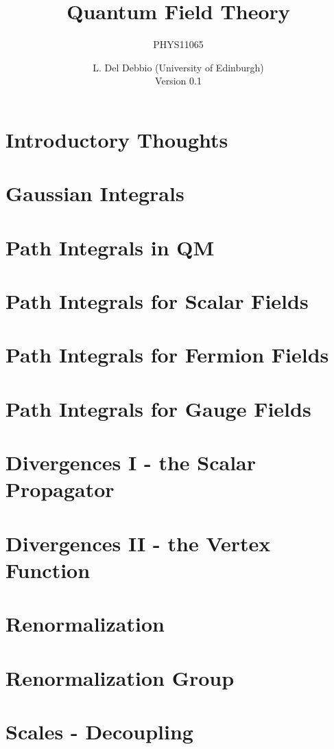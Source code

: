 \documentclass[11pt]{scrreprt}
\title{Quantum Field Theory}
\subtitle{PHYS11065}
\author{L. Del Debbio (University of Edinburgh)\\
  Version 0.1}
\begin{document}

\clearemptydoublepage
\tableofcontents
\clearemptydoublepage


\chapter*{Introductory Thoughts}
\label{chap:intro}


\chapter{Gaussian Integrals}
\label{chap:lec0}


\chapter{Path Integrals in QM}
\label{chap:lec1}


\chapter{Path Integrals for Scalar Fields}
\label{cha:path-integr-scal}



\chapter{Path Integrals for Fermion Fields}
\label{cha:path-integr-ferm}


\chapter{Path Integrals for Gauge Fields}
\label{cha:path-integrals-gauge}



\chapter{Divergences I - the Scalar Propagator}
\label{cha:divergences-i-scalar}



\chapter{Divergences II - the Vertex Function}
\label{cha:diverg-ii-vert}



\chapter{Renormalization}
\label{cha:renormalization}
% 


\chapter{Renormalization Group}
\label{cha:renorm-group}

\chapter{Scales - Decoupling}
\label{cha:scales-decoupling}

\printindex
\end{document}
